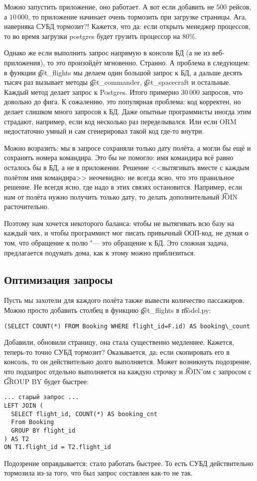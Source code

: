 	Можно запустить приложение, оно работает.
	А вот если добавить не 500 рейсов, а $10\,000$, то приложение начинает очень тормозить при загрузке страницы.
	Ага, наверняка СУБД тормозит?!
	Кажется, что да: если открыть менеджер процессов, то во время загрузки postgres будет грузить процессор на 80\%.

	Однако же если выполнить запрос напрямую в консоли БД (а не из веб-приложения), то это произойдёт мгновенно.
	Странно.
	А проблема в следующем: в функции \t{get\_flights} мы делаем один большой запрос к БД,
	а дальше десять тысяч раз вызывает методы \t{get\_commander}, \t{get\_spacecraft} и остальные.
	Каждый метод делает запрос к Postgres.
	Итого примерно $30\,000$ запросов, что довольно до фига.
	К сожалению, это популярная проблема: код корректен, но делает слишком много запросов к БД.
	Даже опытные программисты иногда этим страдают, например, если код несколько раз переделывался.
	Или если ORM недостаточно умный и сам сгенерировал такой код где-то внутри.

	Можно возразить: мы в запросе сохраняли только дату полёта, а могли бы ещё и сохранять номера командира.
	Это бы не помогло: имя командира всё равно осталось бы в БД, а не в приложении.
	Решение <<вытягивать вместе с каждым полётом имя командира>> неочевидно: не всегда ясно, что это правильное решение.
	Не всегдя ясно, где надо в этих связях остановится.
	Например, если нам от полёта нужно получить только дату, то делать дополнительный \t{JOIN} расточительно.

	Поэтому нам хочется некоторого баланса: чтобы не вытягивать всю базу на каждый чих, и чтобы
	программист мог писать привычный ООП-код, не думая о том, что обращение к полю "--- это обращение к БД.
	Это сложная задача, предлагается подумать дома, как к этому можно приблизиться.

\subsection{Оптимизация запросы}
	Пусть мы захотели для каждого полёта также вывести количество пассажиров.
	Можно просто добавить столбец в функцию \t{get\_flights} в \t{model.py}:
\begin{verbatim}
(SELECT COUNT(*) FROM Booking WHERE flight_id=F.id) AS booking\_count
\end{verbatim}
	Добавили, обновили страницу, она стала существенно медленнее.
	Кажется, теперь-то точно СУБД тормозит?
	Оказывается, да: если скопировать его в консоль, то он действительно долго выполняется.
	Может возникнуть подозрение, что подзапрос отдельно выполняется на каждую строчку и \t{JOIN}'ом с запросом с \t{GROUP BY} будет быстрее:
\begin{verbatim}
... старый запрос ...
LEFT JOIN (
  SELECT flight_id, COUNT(*) AS booking_cnt
  From Booking
  GROUP BY flight_id
) AS T2
ON T1.flight_id = T2.flight_id
\end{verbatim}
	Подозрение оправдывается: стало работать быстрее.
	То есть СУБД действительно тормозила из-за того, что был запрос составлен как-то не так.

